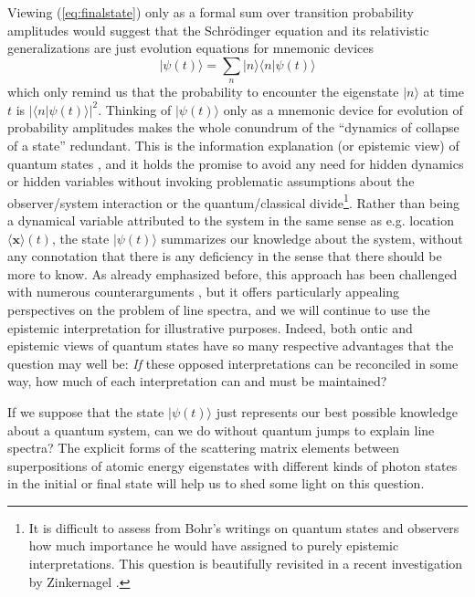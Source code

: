 \documentclass[final,3p,times,twocolumn]{elsarticle3}
\begin{document}
Viewing (\ref{eq:finalstate}) only as a formal sum over transition 
probability amplitudes would suggest that the Schr\"odinger
equation and its relativistic generalizations are just evolution
equations for mnemonic devices
\[
\bm{|}\psi(t)\bm{\rangle}=\sum_n\bm{|}n\bm{\rangle}\bm{\langle} n\bm{|}\psi(t)\bm{\rangle}
\]
which only remind us that the probability to encounter the
eigenstate $\bm{|}n\bm{\rangle}$ at time $t$ is $|\bm{\langle} n\bm{|}\psi(t)\bm{\rangle}|^2$.
Thinking of $\bm{|}\psi(t)\bm{\rangle}$ only as a mnemonic 
device for evolution of probability amplitudes makes the whole 
conundrum of the ``dynamics of collapse of a state'' redundant. This is the 
information explanation (or epistemic view) of quantum 
states \cite{fuchs,qb1,ferrero,spekkens,qb2}, and it holds the promise to 
avoid any need for hidden dynamics or hidden variables without invoking 
problematic assumptions about the observer/system interaction
or the quantum/classical divide\footnote{It is difficult to assess from
Bohr's writings on quantum states and observers how much importance he 
would have assigned
to purely epistemic interpretations. This question is beautifully 
revisited in a recent investigation by Zinkernagel \cite{BohrZ}.}.
Rather than being a dynamical variable attributed to the system in the 
same sense as e.g. location $\langle\bm{x}\rangle(t)$, the 
state $\bm{|}\psi(t)\bm{\rangle}$ summarizes our knowledge about the system, without 
any connotation that there is any deficiency in the sense that there should 
be more to know. As already emphasized before,
this approach has been challenged with numerous counterarguments
\cite{realpsia,realpsi0,realpsi1,realpsi2,realpsi3,realpsi4,realpsi5,realpsi6},
but it offers particularly appealing perspectives on the problem of line spectra,
and we will continue to use the epistemic interpretation for illustrative
purposes. Indeed, both ontic and epistemic views of quantum states have
so many respective advantages that the question may well be: {\it If} these
opposed interpretations can be reconciled in some way, how much of
each interpretation can and must be maintained?

If we suppose that the state $\bm{|}\psi(t)\bm{\rangle}$ just represents our best 
possible knowledge about a quantum system, can we do without quantum jumps to 
explain line spectra? The explicit forms of the scattering matrix elements 
between superpositions of atomic energy eigenstates with different kinds of
photon states in the initial or final state will help us to shed some light 
on this question.
\end{document}
